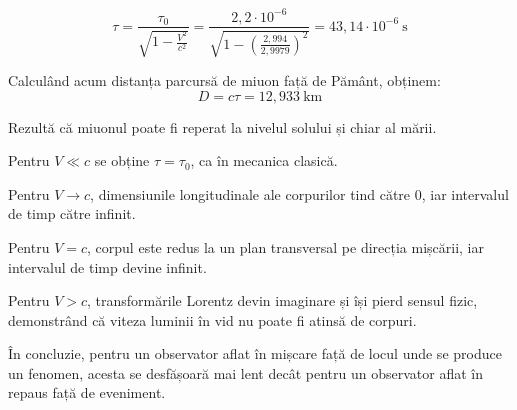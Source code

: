 \documentclass[a4paper, 12pt]{article}
\newcommand{\lorentzradical}{\sqrt{1 - \frac{V^2}{c^2}}}
\begin{document}
\[
    \tau = \frac{\tau_0}{\lorentzradical}
    = \frac{2,2 \cdot 10^{-6}}{\sqrt{1 - \left( \frac{2,994}{2,9979} \right)^2}}
    = 43,14 \cdot 10^{-6} ~ \mathrm{s}
\]

Calculând acum distanța parcursă de miuon față de Pământ, obținem:
\[ D = c\tau = 12,933 ~ \mathrm{km} \]

Rezultă că miuonul poate fi reperat la nivelul solului și chiar al mării.

\pagebreak

Pentru \( V \ll c \) se obține \( \tau = \tau_0 \), ca în mecanica clasică.

Pentru \( V \rightarrow c \), dimensiunile longitudinale ale corpurilor tind
către 0, iar intervalul de timp către infinit.

Pentru \( V = c \), corpul este redus la un plan transversal pe direcția
mișcării, iar intervalul de timp devine infinit.

Pentru \( V > c \), transformările Lorentz devin imaginare și își pierd
sensul fizic, demonstrând că viteza luminii în vid nu poate fi atinsă de
corpuri.

În concluzie, pentru un observator aflat în mișcare față de locul unde se
produce un fenomen, acesta se desfășoară mai lent decât pentru un observator
aflat în repaus față de eveniment.
\end{document}
